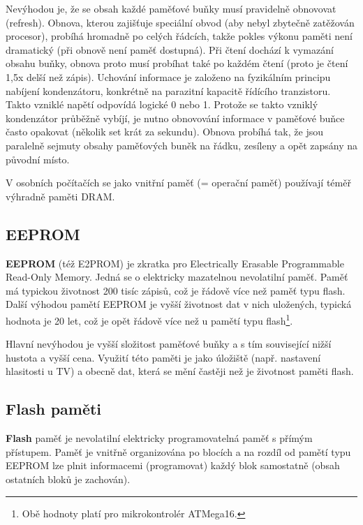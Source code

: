\documentclass[12pt]{article}
\begin{document}
Nevýhodou je, že se obsah každé paměťové buňky musí pravidelně obnovovat (refresh). Obnova, kterou zajišťuje speciální obvod (aby nebyl zbytečně zatěžován procesor), probíhá hromadně po celých řádcích, takže pokles výkonu paměti není dramatický (při obnově není paměť dostupná). Při čtení dochází k vymazání obsahu buňky, obnova proto musí probíhat také po každém čtení (proto je čtení 1,5x delší než zápis). Uchování informace je založeno na fyzikálním principu nabíjení kondenzátoru, konkrétně na parazitní kapacitě řídícího tranzistoru. Takto vzniklé napětí odpovídá logické 0 nebo 1. Protože se takto vzniklý kondenzátor průběžně vybíjí, je nutno obnovování informace v paměťové buňce často opakovat (několik set krát za sekundu). Obnova probíhá tak, že jsou paralelně sejmuty obsahy paměťových buněk na řádku, zesíleny a opět zapsány na původní místo.

V osobních počítačích se jako vnitřní paměť (= operační paměť) používají téměř výhradně paměti DRAM. 


\subsection{EEPROM}

\textbf{EEPROM} (též E2PROM) je zkratka pro Electrically Erasable Programmable Read-Only Memory. Jedná se o elektricky mazatelnou nevolatilní paměť. Paměť má typickou životnost 200 tisíc zápisů, což je řádově více než paměť typu flash. Další výhodou pamětí EEPROM je vyšší životnost dat v nich uložených, typická hodnota je 20 let, což je opět řádově více než u pamětí typu flash\footnote{Obě hodnoty platí pro mikrokontrolér ATMega16.}. 

Hlavní nevýhodou je vyšší složitost paměťové buňky a s tím související nižší hustota a vyšší cena. Využití této paměti je jako úložiště (např. nastavení hlasitosti u TV) a obecně dat, která se mění častěji než je životnost paměti flash. 
 
\subsection{Flash paměti}

\textbf{Flash} paměť je nevolatilní  elektricky programovatelná paměť s přímým přís\-tu\-pem. Paměť je vnitřně organizována po blocích a na rozdíl od pamětí typu EEPROM lze plnit informacemi (programovat) každý blok samostatně (obsah ostatních bloků je zachován).  
\end{document}
